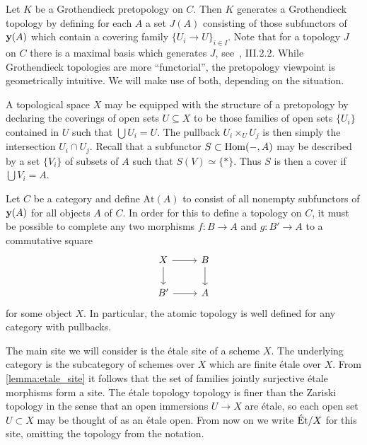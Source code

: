 Let $K$ be a Grothendieck pretopology on $C$. Then $K$ generates a Grothendieck topology by defining for each $A$ a set $J(A)$ consisting of those subfunctors of $\mathbf{y}(A)$ which contain a covering family $\{U_i \to U\}_{i \in I}$. Note that for a topology $J$ on $C$ there is a maximal basis which generates $J$, see~\cite{SIGL}, III.2.2. While Grothendieck topologies are more ``functorial'', the pretopology viewpoint is geometrically intuitive. We will make use of both, depending on the situation.

\begin{example}
	A topological space $X$ may be equipped with the structure of a pretopology by declaring the coverings of open sets $U \subseteq X$ to be those families of open sets $\{U_i\}$ contained in $U$ such that $\displaystyle\bigcup U_i = U$. The pullback $U_i \times_U U_j$ is then simply the intersection $U_i \cap U_j$. Recall that a subfunctor $S \subset \operatorname{Hom}(-,A)$ may be described by a set $\{V_i\}$ of subsets of $A$ such that $S(V) \simeq \{*\}$. Thus $S$  is then a cover if $\bigcup V_i = A$.
\end{example}

\begin{example}
	Let $C$ be a category and define $\text{At}(A)$ to consist of all nonempty subfunctors of $\mathbf{y}(A)$ for all objects $A$ of $C$. In order for this to define a topology on $C$, it must be possible to complete any two morphisms $f \colon  B \to A$ and $g \colon B' \to A$ to a commutative square
	\[
		\begin{tikzcd}
			X & B \\
			B' & A
			\arrow[from=1-1, to=2-1]
			\arrow[from=1-1, to=1-2]
			\arrow[from=1-2, to=2-2]
			\arrow[from=2-1, to=2-2]
		\end{tikzcd}
	\]
	for some object $X$. In particular, the atomic topology is well defined for any category with pullbacks.
\end{example}

\begin{example}
	The main site we will consider is the \'etale site of a scheme $X$. The underlying category is the subcategory of schemes over $X$ which are finite \'etale over $X$. From \ref{lemma:etale_site} it follows that the set of families jointly surjective \'etale morphisms form a site. The \'etale topology topology is finer than the Zariski topology in the sense that an open immersions $U \to X$ are \'etale, so each open set $U \subset X$ may be thought of as an \'etale open. From now on we write $\text{\'Et}/X$ for this site, omitting the topology from the notation.
\end{example}

